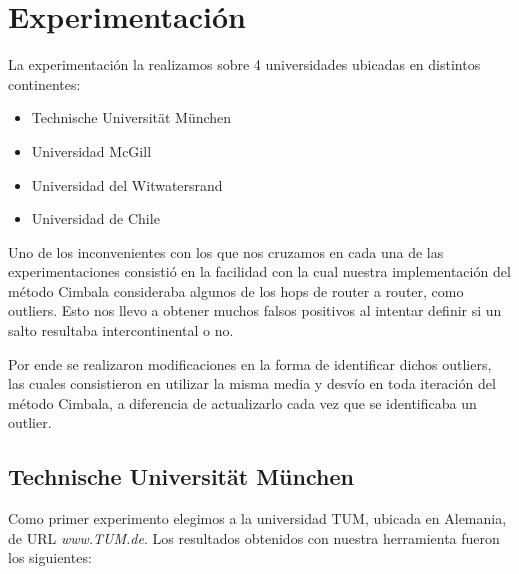 \documentclass[a4paper,10pt]{article}
\begin{document}
\medskip
\medskip
\newpage

\section{Experimentación}
\par{La experimentación la realizamos sobre 4 universidades ubicadas en distintos continentes:}
\begin{itemize}
    \item Technische Universität München
    \item Universidad McGill
    \item Universidad del Witwatersrand
    \item Universidad de Chile
\end{itemize}


\medskip
\par{Uno de los inconvenientes con los que nos cruzamos en cada una de las experimentaciones consistió en la facilidad con la cual nuestra implementación del método Cimbala consideraba algunos de los hops de router a router, como outliers. Esto nos llevo a obtener muchos falsos positivos al intentar definir si un salto resultaba intercontinental o no.}
\par{Por ende se realizaron modificaciones en la forma de identificar dichos outliers, las cuales consistieron en utilizar la misma media y desvío en toda iteración del método Cimbala, a diferencia de actualizarlo cada vez que se identificaba un outlier.}

\subsection{Technische Universität München}
\medskip
\par{ Como primer experimento elegimos a la universidad TUM, ubicada en Alemania, de URL \textit{www.TUM.de}. Los resultados obtenidos con nuestra herramienta fueron los siguientes: }

\medskip
\end{document}
